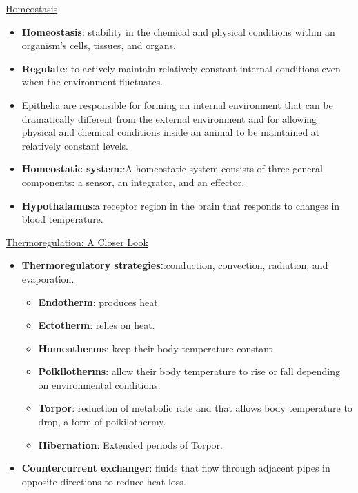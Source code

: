 \documentclass[12pt,letterpaper]{article}
\begin{document}
\hypertarget{39.4}{}
\begin{secbox}{\hyperlink{39}{Homeostasis}}{
    \begin{itemize}
        \item \textbf{Homeostasis}: stability in the chemical and physical conditions within an organism’s cells, tissues, and organs.
        \item \textbf{Regulate}: to actively maintain relatively constant internal conditions even when the environment fluctuates.
        \item Epithelia are responsible for forming an internal environment that can be dramatically different from the external environment and for allowing physical and chemical conditions inside an animal to be maintained at relatively constant levels.
        \item \textbf{Homeostatic system:}:A homeostatic system consists of three general components: a sensor, an integrator, and an effector.
        \item \textbf{Hypothalamus}:a receptor region in the brain that responds to changes in blood temperature.
    \end{itemize}
}\end{secbox}

\hypertarget{39.5}{}
\begin{secbox}{\hyperlink{39}{Thermoregulation: A Closer Look}}{
    \begin{itemize}
        \item \textbf{Thermoregulatory strategies:}:conduction, convection, radiation, and evaporation.
        \begin{itemize}
            \item \textbf{Endotherm}: produces heat.
            \item \textbf{Ectotherm}: relies on heat.
            \item \textbf{Homeotherms}: keep their body temperature constant
            \item \textbf{Poikilotherms}: allow their body temperature to rise or fall depending on environmental conditions.
            \item \textbf{Torpor}: reduction of metabolic rate and that allows body temperature to drop, a form of poikilothermy.
            \item \textbf{Hibernation}: Extended periods of Torpor. 
        \end{itemize}
        \item \textbf{Countercurrent exchanger}: fluids that flow through adjacent pipes in opposite directions to reduce heat loss.
    \end{itemize}
}\end{secbox} 
\end{document}
